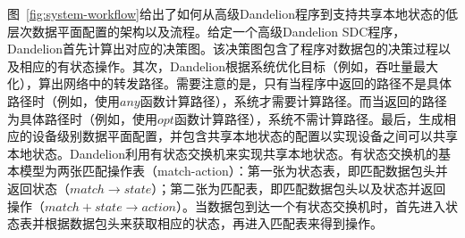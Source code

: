 图~\ref{fig:system-workflow}给出了如何从高级Dandelion程序到支持共享本地状态的低层次数据平面配置的架构以及流程。给定一个高级Dandelion SDC程序，Dandelion首先计算出对应的决策图。该决策图包含了程序对数据包的决策过程以及相应的有状态操作。其次，Dandelion根据系统优化目标（例如，吞吐量最大化），算出网络中的转发路径。需要注意的是，只有当程序中返回的路径不是具体路径时（例如，使用$any$函数计算路径），系统才需要计算路径。而当返回的路径为具体路径时（例如，使用$opt$函数计算路径），系统不需计算路径。最后，生成相应的设备级别数据平面配置，并包含共享本地状态的配置以实现设备之间可以共享本地状态。Dandelion利用有状态交换机来实现共享本地状态。有状态交换机的基本模型为两张匹配操作表（match-action）：第一张为状态表，即匹配数据包头并返回状态（$match \rightarrow state$）；第二张为匹配表，即匹配数据包头以及状态并返回操作（$match+state \rightarrow action$）。当数据包到达一个有状态交换机时，首先进入状态表并根据数据包头来获取相应的状态，再进入匹配表来得到操作。


